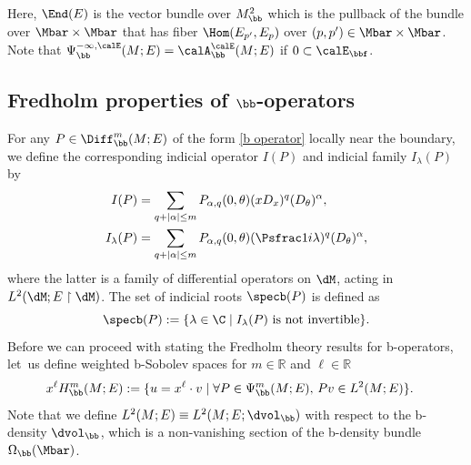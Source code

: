 Here, $\End(E)$ is the vector bundle over $M^2_\bb$ which is the pullback of the bundle over $\Mbar\times\Mbar$ that has fiber $\Hom(E_{p'},E_p)$ over $(p,p')\in
\Mbar\times\Mbar$.
Note that $\Psi^{-\infty,\calE}_\bb(M;E) = \calA_\bb^\calE(M;E)$ if $0\subset\calE_\bbf$.

\subsection{Fredholm properties of \texorpdfstring{$\bb$}{b}-operators}\label{subsection-I}
For any $P \in \Diff^{m}_\bb(M; E)$ of the form \eqref{b operator} locally near the
boundary, we define the corresponding indicial operator $I(P)$ and indicial family $I_\lambda(P)$ by
\begin{align*}
I(P) &= \sum_{q+ \vert \alpha\vert \leq m} P_{\alpha, q}(0,\theta) (xD_x)^q (D_{\theta})^{\alpha}, \\
I_\lambda (P) &= \sum_{q+ \vert \alpha\vert \leq m} P_{\alpha, q}(0,\theta)(\Psfrac1i\lambda)^{q}(D_{\theta})^{\alpha},
\end{align*}
where the latter is a family of differential operators on $\dM$, acting in $L^2(\dM;E\restriction \dM)$. The set of indicial roots
$\specb(P)$ is defined as
\[
\specb(P):= \{\lambda \in \C \mid I_{\lambda}(P) \ \text{is not invertible}\}.
\]
Before we can proceed with stating the Fredholm theory results for b-operators,
let~us define weighted b-Sobolev spaces for $m \in \mathbb{R}$ and $\ell \in \mathbb{R}$
\begin{align*}
&x^{\ell}H^{m}_\bb(M;E) := \{ u = x^{\ell} \cdot v
\mid \forall P \in
\Psi^{m}_\bb(M;E),\,P v \in L^{2}(M;E)\}.
\end{align*}
Note that we define $L^2(M;E) \equiv L^2(M; E; \dvol_\bb)$ with respect to the b-density $\dvol_\bb$,
which is a non-vanishing section of the b-density bundle $\Omega_\bb(\Mbar)$.

